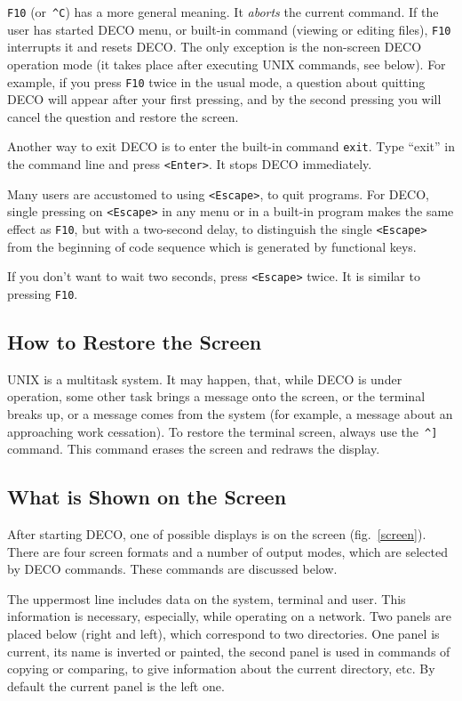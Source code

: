 {\tt F10} (or~{\tt \^{}C}) has a more general meaning. It {\em aborts} the
current command. If the user has started DECO
menu, or built-in command (viewing or editing files), 
{\tt F10} interrupts it and resets DECO. The only exception
is the non-screen DECO operation mode (it takes place 
after executing UNIX commands, see below). For
example, if you press {\tt F10} twice in the usual mode, a
question about quitting DECO will appear after your 
first pressing, and by the second pressing you will 
cancel the question and restore the screen.

Another way to exit DECO is to enter the built-in command {\tt exit}.
Type ``exit'' in the command line and press {\tt <Enter>}.
It stops DECO immediately.

Many users are accustomed to using {\tt <Escape>}, to
quit programs. For DECO, single pressing on {\tt <Escape>} in
any menu or in a built-in program makes the same 
effect as {\tt F10}, but with a two-second delay, to distinguish
the single {\tt <Escape>} from the beginning of code sequence
which is generated by functional keys.

If you don't want to wait two seconds, press {\tt <Escape>} twice.
It is similar to pressing {\tt F10}.

\subsection{How to Restore the Screen}

UNIX is a multitask system. It may happen, that, while
DECO is under operation, some other task brings a 
message onto the screen, or the terminal breaks up, or 
a message comes from the system (for example, a 
message about an approaching work cessation). To 
restore the terminal screen, always use the~{\tt \^{}]}
command. This command erases the screen and redraws the display.

\subsection{What is Shown on the Screen}

After starting DECO, one of possible displays is on the screen
(fig.~\ref{screen}). There are four screen formats and
a number of output modes, which are selected by 
DECO commands. These commands are discussed below.

The uppermost line includes data on the system, terminal and user.
This information is necessary, especially, while operating on a network.
Two panels are placed below (right and left), which 
correspond to two directories. One panel is current, its 
name is inverted or painted, the second panel is used 
in commands of copying or comparing, to give information about the
current directory, etc. By default the current panel is the left one.

